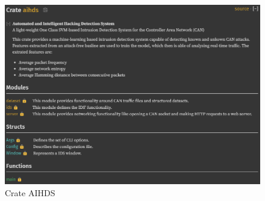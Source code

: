 \begin{figure}
    \centering
    \includegraphics[width = \linewidth]{img/parts/docs/crate.png}
    \caption{Crate AIHDS}
    \label{fig:doc_crate}
\end{figure}

